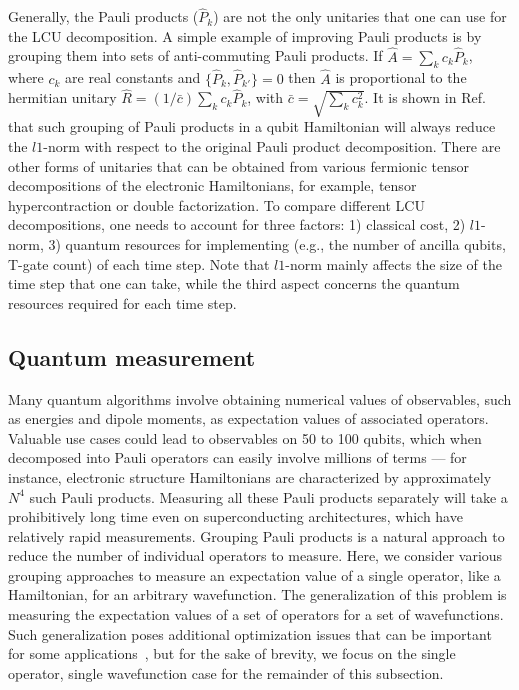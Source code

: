Generally, the Pauli products ($\hat P_k$) are not the only unitaries that one can use for the LCU decomposition. A simple example of improving Pauli products is by grouping them into sets of anti-commuting Pauli products. If $\hat A = \sum_k c_k \hat P_k$, where $c_k$ are real constants and $\{\hat P_k,\hat P_{k'}\}=0$ then $\hat A$ is proportional to the hermitian unitary $\hat R = (1/\bar{c})\sum_k c_k \hat P_k$, with $\bar{c}=\sqrt{\sum_k c_k^2}$. It is shown in Ref.~ that such grouping of Pauli products in a qubit Hamiltonian will always reduce the $l1$-norm with respect to the original Pauli product decomposition. There are other forms of unitaries that can be obtained from various fermionic tensor decompositions of the electronic Hamiltonians, for example, tensor hypercontraction or double factorization.\cite{PRXQuantum.2.030305,loaiza2023LCU1} To compare different LCU decompositions, one needs to account for three factors: 1) classical cost, 2) $l1$-norm, 3) quantum resources for implementing (e.g., the number of ancilla qubits, T-gate count) of each time step. Note that $l1$-norm mainly affects the size of the time step that one can take, while the third aspect concerns the quantum resources required for each time
step.

\subsection{Quantum measurement}


Many quantum algorithms involve obtaining numerical values of observables, such as energies and dipole moments, as expectation values of associated operators.
Valuable use cases could lead to observables on 50 to 100 qubits, which when decomposed into Pauli operators can easily involve millions of terms — for instance, electronic structure Hamiltonians are characterized by approximately $N^4$ such Pauli products.
Measuring all these Pauli products separately will take a prohibitively long time even on superconducting architectures, which have relatively rapid measurements.
Grouping Pauli products is a natural approach to reduce the number of individual operators to measure.
Here, we consider various grouping approaches to measure an expectation value of a single operator, like a Hamiltonian, for an arbitrary wavefunction.
The generalization of this problem is measuring the expectation values of a set of operators for a set of wavefunctions.
Such generalization poses additional optimization issues that can be important for some applications~\cite{Choi:ExcSt}, but for the sake of brevity, we focus on the single operator, single wavefunction case for the remainder of this subsection.

